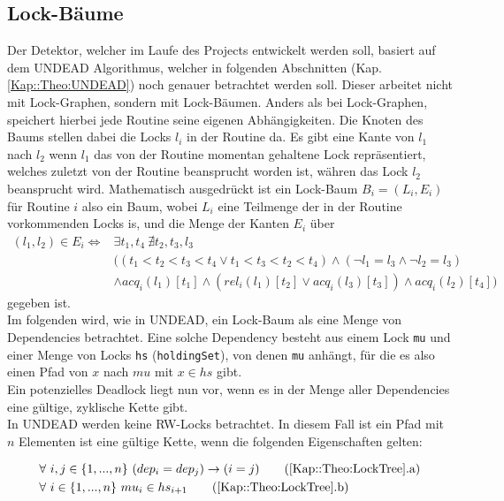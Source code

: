\subsection{Lock-Bäume} \label{Kap::Theo:LockTree}
Der Detektor, welcher im Laufe des Projects entwickelt werden soll, basiert auf dem 
UNDEAD Algorithmus, welcher in folgenden Abschnitten (Kap. \ref{Kap::Theo:UNDEAD})
noch genauer betrachtet werden soll. Dieser arbeitet nicht mit Lock-Graphen, 
sondern mit Lock-Bäumen.
Anders als bei Lock-Graphen, speichert hierbei jede Routine  
seine eigenen Abhängigkeiten. Die Knoten des Baums stellen dabei die 
Locks $l_i$ in der Routine da. Es gibt eine Kante von $l_1$ nach $l_2$ wenn 
$l_1$ das von der Routine momentan gehaltene Lock repräsentiert, welches zuletzt 
von der Routine beansprucht worden ist,
währen das Lock $l_2$ beansprucht wird\cite{agarwal}. 
Mathematisch ausgedrückt ist ein Lock-Baum $B_i = (L_i, E_i)$ für Routine $i$ also ein 
Baum, wobei $L_i$ eine Teilmenge der in der Routine vorkommenden Locks is, und 
die Menge der Kanten $E_i$ über
\begin{align*}
    (l_1, l_2) \in E_i \Leftrightarrow &\exists t_1, t_4\ \nexists t_2, t_3, l_3\\
    &((t_1 < t_2 < t_3 < t_4 \lor t_1 < t_3 < t_2 < t_4) \land (\lnot l_1 = l_3 \land \lnot l_2 = l_3)\\
    & \land acq_i(l_1)[t_1] \land (rel_i(l_1)[t_2] \lor acq_i(l_3)[t_3]) \land acq_i(l_2)[t_4])
\end{align*}
gegeben ist.\\
Im folgenden wird, wie in UNDEAD, ein Lock-Baum als eine Menge von Dependencies betrachtet. 
Eine solche Dependency besteht aus einem Lock \texttt{mu} und einer Menge von Locks \texttt{hs}
(\texttt{holdingSet}),
von denen \texttt{mu} anhängt, für die es also einen Pfad von $x$ nach $mu$ mit $x \in hs$ gibt.\\
Ein potenzielles Deadlock liegt nun vor, wenn es in der Menge aller Dependencies
eine gültige, zyklische Kette gibt.\\
In UNDEAD werden keine RW-Locks betrachtet. In diesem Fall ist ein Pfad mit $n$
Elementen ist eine gültige Kette, wenn die folgenden Eigenschaften gelten:

\begin{align}
  &\forall\ i, j \in \{1,...,n\}\ (dep_i = dep_j) \rightarrow (i = j) \tag{\ref{Kap::Theo:LockTree}.a}
  \label{For::Theo:LockTree.a}\\
  &\forall\ i \in \{1,...,n\}\ mu_i \in hs_{i+1} 
  \tag{\ref{Kap::Theo:LockTree}.b}
  \label{For::Theo:LockTree.b}
\end{align}

